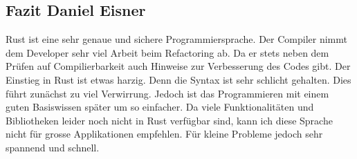 \subsection{Fazit Daniel Eisner}
Rust ist eine sehr genaue und sichere Programmiersprache. Der Compiler nimmt dem Developer sehr viel Arbeit beim Refactoring ab. Da er stets neben dem Prüfen auf Compilierbarkeit auch Hinweise zur Verbesserung des Codes gibt. Der Einstieg in Rust ist etwas harzig. Denn die Syntax ist sehr schlicht gehalten. Dies führt zunächst zu viel Verwirrung. Jedoch ist das Programmieren mit einem guten Basiswissen später um so einfacher. Da viele Funktionalitäten und Bibliotheken leider noch nicht in Rust verfügbar sind, kann ich diese Sprache nicht für grosse Applikationen empfehlen. Für kleine Probleme jedoch sehr spannend und schnell.
